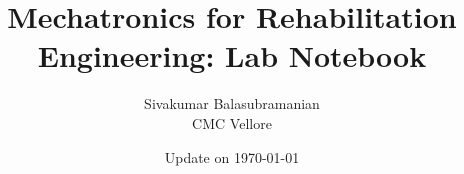 \documentclass[12pt,twoside]{book}
\begin{document}
\title{\bf \huge Mechatronics for Rehabilitation Engineering: Lab Notebook}
\author{Sivakumar Balasubramanian \\ CMC Vellore}
\date{Update on \today}
\maketitle
\setcounter{tocdepth}{2}
\setcounter{minitocdepth}{1} 

\begin{multicols}{2}
    \dominitoc%
    \adjustmtc[2]%
    {\footnotesize %
      \tableofcontents
      \label{toc-contents}
    }
\end{multicols}




% 

% 


% 
% 
% 
% 
% 
% 
% 
% 
% 
\end{document}
